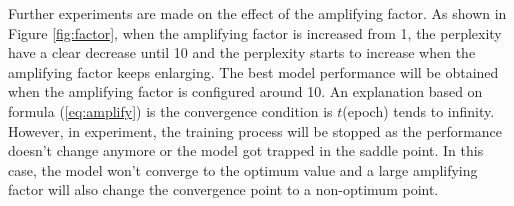 Further experiments are made on the effect of the amplifying factor. As shown in Figure \ref{fig:factor}, when the amplifying factor is increased from 1, the perplexity have a clear decrease until 10 and the perplexity starts to increase when the amplifying factor keeps enlarging. The best model performance will be obtained when the amplifying factor is configured around 10. An explanation based on formula (\ref{eq:amplify}) is the convergence condition is $t$(epoch) tends to infinity. However, in experiment, the training process will be stopped as the performance doesn't change anymore or the model got trapped in the saddle point. In this case, the model won't converge to the optimum value and a large amplifying factor will also change the convergence point to a non-optimum point.




